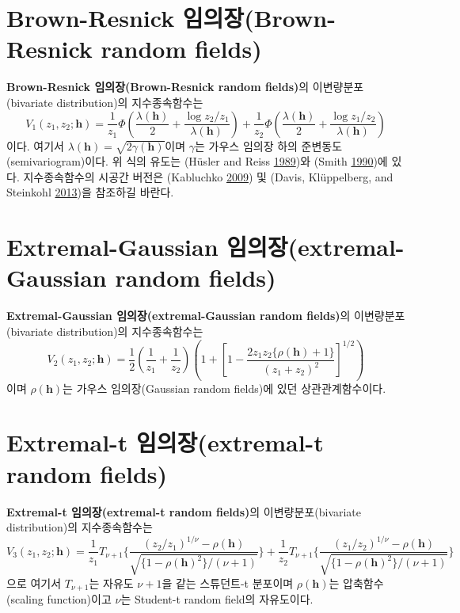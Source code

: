 \documentclass[b5paper,]{book}
\theoremstyle{definition}
\theoremstyle{definition}
\theoremstyle{definition}
\theoremstyle{remark}
\begin{document}
\section{Brown-Resnick 임의장(Brown-Resnick random
fields)}\label{brown-resnick-brown-resnick-random-fields}

\textbf{Brown-Resnick 임의장(Brown-Resnick random fields)}의
이변량분포(bivariate distribution)의 지수종속함수는 \[
V_{1}(z_{1},z_{2};\mathbf{h})=\frac{1}{z_{1}}\Phi (\frac{\lambda(\mathbf{h})}{2}+\frac{\log z_{2}/z_{1}}{\lambda(\mathbf{h})}) + \frac{1}{z_{2}}\Phi (\frac{\lambda(\mathbf{h})}{2}+\frac{\log z_{1}/z_{2}}{\lambda(\mathbf{h})})
\] 이다. 여기서 \(\lambda(\mathbf{h})=\sqrt{2\gamma(\mathbf{h})}\)이며
\(\gamma\)는 가우스 임의장 하의 준변동도(semivariogram)이다. 위 식의
유도는 (Hüsler and Reiss \protect\hyperlink{ref-Husler1989}{1989})와
(Smith \protect\hyperlink{ref-Smith1990}{1990})에 있다. 지수종속함수의
시공간 버전은 (Kabluchko \protect\hyperlink{ref-Kabluchko2009b}{2009})
및 (Davis, Klüppelberg, and Steinkohl
\protect\hyperlink{ref-Davis2013}{2013})을 참조하길 바란다.

\section{Extremal-Gaussian 임의장(extremal-Gaussian random
fields)}\label{extremal-gaussian-extremal-gaussian-random-fields}

\textbf{Extremal-Gaussian 임의장(extremal-Gaussian random fields)}의
이변량분포(bivariate distribution)의 지수종속함수는 \[
V_{2}(z_{1},z_{2};\mathbf{h})=\frac{1}{2}(\frac{1}{z_{1}}+\frac{1}{z_{2}})(1+[1-\frac{2z_{1}z_{2}\{\rho(\mathbf{h})+1\}}{(z_{1}+z_{2})^{2}}]^{1/2})
\] 이며 \(\rho(\mathbf{h})\)는 가우스 임의장(Gaussian random fields)에
있던 상관관계함수이다.

\section{Extremal-t 임의장(extremal-t random
fields)}\label{extremal-t-extremal-t-random-fields}

\textbf{Extremal-t 임의장(extremal-t random fields)}의
이변량분포(bivariate distribution)의 지수종속함수는 \[
V_{3}(z_{1},z_{2};\mathbf{h})=\frac{1}{z_{1}}T_{\nu+1}\{\frac{(z_{2}/z_{1})^{1/\nu}-\rho(\mathbf{h})}{\sqrt{\{ 1-\rho(\mathbf{h})^{2} \}/(\nu+1) }}\} + \frac{1}{z_{2}}T_{\nu+1}\{\frac{(z_{1}/z_{2})^{1/\nu}-\rho(\mathbf{h})}{\sqrt{\{ 1-\rho(\mathbf{h})^{2} \}/(\nu+1) }}\}
\] 으로 여기서 \(T_{\nu+1}\)는 자유도 \(\nu+1\)을 같는 스튜던트-t
분포이며 \(\rho(\mathbf{h})\)는 압축함수(scaling function)이고 \(\nu\)는
Student-t random field의 자유도이다.
\end{document}
